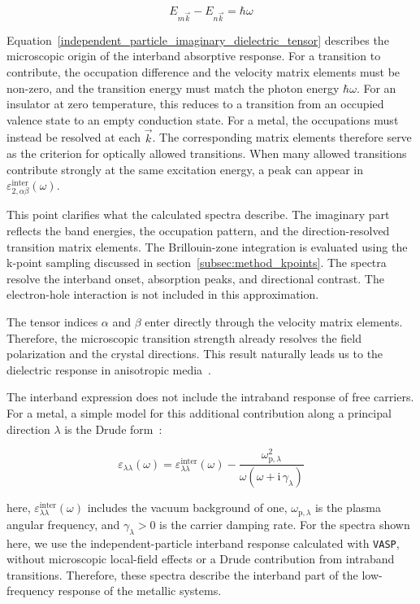 \begin{equation}
    E_{m\vec{k}}-E_{n\vec{k}}=\hbar\omega
\label{dirac_energy_conservation_condition}
\end{equation}

Equation~\eqref{independent_particle_imaginary_dielectric_tensor} describes the microscopic origin of the interband absorptive response.
For a transition to contribute, the occupation difference and the velocity matrix elements must be non-zero,
and the transition energy must match the photon energy $\hbar\omega$.
For an insulator at zero temperature, this reduces to a transition from an occupied valence state to an empty conduction state.
For a metal, the occupations must instead be resolved at each $\vec{k}$.
The corresponding matrix elements therefore serve as the criterion for optically allowed transitions.
When many allowed transitions contribute strongly at the same excitation energy,
a peak can appear in $\varepsilon_{2,\alpha\beta}^{\mathrm{inter}}(\omega)$.

This point clarifies what the calculated spectra describe.
The imaginary part reflects the band energies, the occupation pattern,
and the direction-resolved transition matrix elements.
The Brillouin-zone integration is evaluated using the k-point sampling discussed in section~\ref{subsec:method_kpoints}.
The spectra resolve the interband onset, absorption peaks, and directional contrast.
The electron-hole interaction is not included in this approximation.

The tensor indices $\alpha$ and $\beta$ enter directly through the velocity matrix elements.
Therefore, the microscopic transition strength already resolves the field polarization and the crystal directions.
This result naturally leads us to the dielectric response in anisotropic media~\cite{huang2023optical}.

The interband expression does not include the intraband response of free carriers.
For a metal, a simple model for this additional contribution along a principal direction $\lambda$ is the Drude form~\cite{dressel2002electrodynamics}:

\begin{equation}
    \varepsilon_{\lambda\lambda}(\omega)
    = \varepsilon_{\lambda\lambda}^{\mathrm{inter}}(\omega)
    - \frac{\omega_{\mathrm{p},\lambda}^{2}}
    {\omega\left(\omega+\mathrm{i}\,\gamma_{\lambda}\right)}
\label{interband_and_drude_dielectric_response}
\end{equation}

here, $\varepsilon_{\lambda\lambda}^{\mathrm{inter}}(\omega)$ includes the vacuum background of one,
$\omega_{\mathrm{p},\lambda}$ is the plasma angular frequency,
and $\gamma_{\lambda}>0$ is the carrier damping rate.
For the spectra shown here, we use the independent-particle interband response calculated with \texttt{VASP},
without microscopic local-field effects or a Drude contribution from intraband transitions.
Therefore, these spectra describe the interband part of the low-frequency response of the metallic systems.

